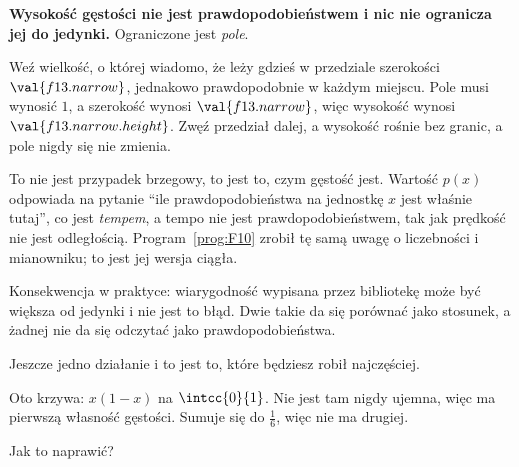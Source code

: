 \begin{fr}
\begin{trapbox}
\textbf{Wysokość gęstości nie jest prawdopodobieństwem i nic nie ogranicza jej
do jedynki.} Ograniczone jest \emph{pole}.

Weź wielkość, o której wiadomo, że leży gdzieś w przedziale szerokości
$\val{f13.narrow}$, jednakowo prawdopodobnie w każdym miejscu. Pole musi
wynosić $1$, a szerokość wynosi $\val{f13.narrow}$, więc wysokość wynosi
$\val{f13.narrow.height}$. Zwęź przedział dalej, a wysokość rośnie bez granic,
a pole nigdy się nie zmienia.

To nie jest przypadek brzegowy, to jest to, czym gęstość jest. Wartość $p(x)$
odpowiada na pytanie \enquote{ile prawdopodobieństwa na jednostkę $x$ jest
właśnie tutaj}, co jest \emph{tempem}, a tempo nie jest prawdopodobieństwem,
tak jak prędkość nie jest odległością. Program~\ref{prog:F10} zrobił tę samą
uwagę o liczebności i mianowniku; to jest jej wersja ciągła.

Konsekwencja w praktyce: wiarygodność wypisana przez bibliotekę może być
większa od jedynki i nie jest to błąd. Dwie takie da się porównać jako
stosunek, a żadnej nie da się odczytać jako prawdopodobieństwa.
\end{trapbox}

\end{fr}

\begin{fr}
Jeszcze jedno działanie i to jest to, które będziesz robił najczęściej.

Oto krzywa: $x(1-x)$ na $\intcc{0}{1}$. Nie jest tam nigdy ujemna, więc ma
pierwszą własność gęstości. Sumuje się do $\frac{1}{6}$, więc nie
ma drugiej.

Jak to naprawić?
\nextframe
\end{fr}

